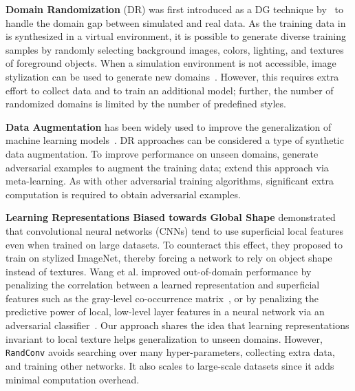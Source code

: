 \documentclass{article} \usepackage{iclr2021_conference,times}
\newcommand{\RandConv}{\texttt{RandConv}}
\begin{document}
\textbf{Domain Randomization} (DR) was first introduced as a DG technique by~\citet{tobin2017domain} to handle the domain gap between simulated and real data. As the training data in~\citep{tobin2017domain} is synthesized in a virtual environment, it is possible to generate diverse training samples by randomly selecting background images, colors, lighting, and textures of foreground objects. When a simulation environment is not accessible, image stylization can be used to generate new domains~\citep{yue2019domain,geirhos2018imagenettrained}. However, this requires extra effort to collect data and to train an additional model; further, the number of randomized domains is limited by the number of predefined styles.

\textbf{Data Augmentation} has been widely used to improve the generalization of machine learning models~\citep{simard2003best}. DR approaches can be considered a type of synthetic data augmentation. To improve performance on unseen domains, \citet{volpi2018generalizing} generate adversarial examples to augment the training data;  \citet{qiao2020learning} extend this approach via meta-learning. As with other adversarial training 
algorithms, significant extra computation is required to obtain adversarial examples.

\textbf{Learning Representations Biased towards Global Shape}
\citet{geirhos2018imagenettrained} demonstrated that convolutional neural networks (CNNs) tend to use superficial local features even when trained on large datasets. To counteract this effect, they proposed to train on stylized ImageNet, thereby forcing a network to rely on object shape instead of textures. Wang et al. improved out-of-domain performance by penalizing the correlation between a learned representation and superficial features such as the gray-level co-occurrence matrix~\citep{wang2018learning}, or by penalizing the predictive power of local, low-level layer features in a neural network via an adversarial classifier~\citep{wang2019learning}. Our approach shares the idea that learning representations invariant to local texture helps generalization to unseen domains. However, {\RandConv} avoids searching over many hyper-parameters, collecting extra data, and training other networks. It also scales to large-scale datasets since it adds minimal computation overhead.
\end{document}
